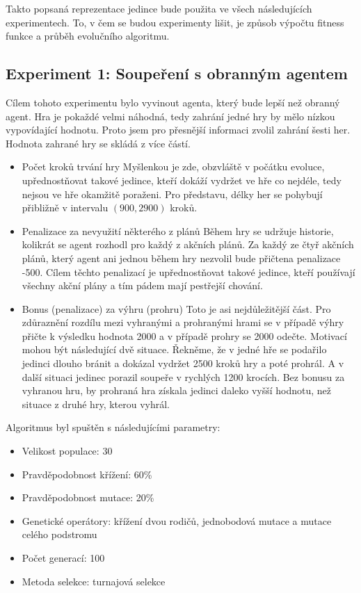 Takto popsaná reprezentace jedince bude použita ve všech následujících experimentech. To, v čem se budou experimenty lišit, je způsob výpočtu fitness funkce a průběh evolučního algoritmu.

\newpage
\subsection{Experiment 1: Soupeření s obranným agentem}
Cílem tohoto experimentu bylo vyvinout agenta, který bude lepší než obranný agent.
Hra je pokaždé velmi náhodná, tedy zahrání jedné hry by mělo nízkou vypovídající hodnotu. Proto jsem pro přesnější informaci zvolil zahrání šesti her.
Hodnota zahrané hry se skládá z více částí.
\begin{itemize}
    \item Počet kroků trvání hry
        \newline
        Myšlenkou je zde, obzvláště v počátku evoluce, upřednostňovat takové jedince, kteří dokáží vydržet ve hře co nejdéle, tedy nejsou ve hře okamžitě poraženi.
        Pro představu, délky her se pohybují přibližně v intervalu $(900, 2900)$ kroků.
    \item Penalizace za nevyužití některého z plánů
        \newline
        Během hry se udržuje historie, kolikrát se agent rozhodl pro každý z akčních plánů.
        Za každý ze čtyř akčních plánů, který agent ani jednou během hry nezvolil bude přičtena penalizace -500. Cílem těchto penalizací je upřednostňovat takové jedince, kteří používají všechny akční plány a tím pádem mají pestřejší chování. 
    \item Bonus (penalizace) za výhru (prohru)
        \newline
        Toto je asi nejdůležitější část. Pro zdůraznění rozdílu mezi vyhranými a prohranými hrami se v případě výhry přičte k výsledku hodnota 2000 a v případě prohry se 2000 odečte.
        Motivací mohou být následující dvě situace. Řekněme, že v jedné hře se podařilo jedinci dlouho bránit a dokázal vydržet 2500 kroků hry a poté prohrál. A v další situaci jedinec porazil soupeře v rychlých 1200 krocích. 
        Bez bonusu za vyhranou hru, by prohraná hra získala jedinci daleko vyšší hodnotu, než situace z druhé hry, kterou vyhrál.        
    
\end{itemize}

Algoritmus byl spuštěn s následujícími parametry:
\begin{itemize}
    \item Velikost populace: 30
    \item Pravděpodobnost křížení: 60\%
    \item Pravděpodobnost mutace: 20\%
    \item Genetické operátory: křížení dvou rodičů, jednobodová mutace a mutace celého podstromu
    \item Počet generací: 100
    \item Metoda selekce: turnajová selekce
\end{itemize}

